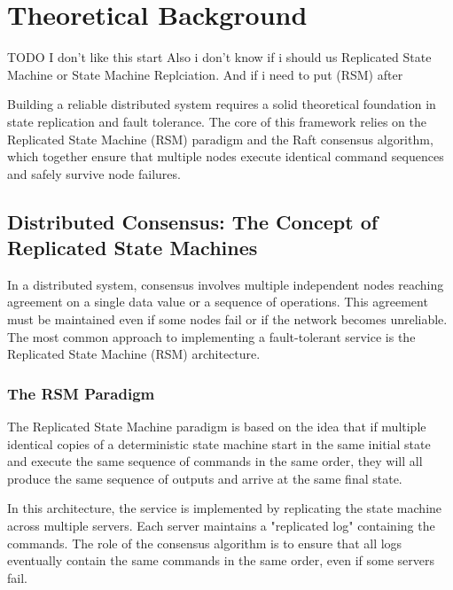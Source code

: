 \chapter{Theoretical Background}
\label{ch:theoretical_background}

TODO I don't like this start
Also i don't know if i should us Replicated State Machine or State Machine Replciation. And if i need to put (RSM) after

Building a reliable distributed system requires a solid theoretical foundation in state replication and fault tolerance. The core of this framework relies on the Replicated State Machine (RSM) paradigm and the Raft consensus algorithm, which together ensure that multiple nodes execute identical command sequences and safely survive node failures.

\section{Distributed Consensus: The Concept of Replicated State Machines}
In a distributed system, consensus involves multiple independent nodes reaching agreement on a single data value or a sequence of operations. This agreement must be maintained even if some nodes fail or if the network becomes unreliable. The most common approach to implementing a fault-tolerant service is the Replicated State Machine (RSM) architecture.

\subsection{The RSM Paradigm}
The Replicated State Machine paradigm \cite{Schneider1990} is based on the idea that if multiple identical copies of a deterministic state machine start in the same initial state and execute the same sequence of commands in the same order, they will all produce the same sequence of outputs and arrive at the same final state. 

In this architecture, the service is implemented by replicating the state machine across multiple servers. Each server maintains a "replicated log" containing the commands. The role of the consensus algorithm is to ensure that all logs eventually contain the same commands in the same order, even if some servers fail.

